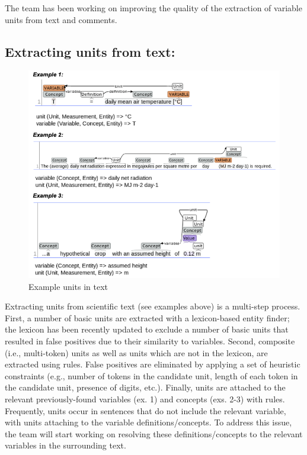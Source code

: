 \documentclass[article, 12pt, oneside]{memoir}
\begin{document}
The team has been working on improving the quality of the extraction of
variable units from text and comments.

\hypertarget{extracting-units-from-text}{%
\subsection{Extracting units from
text:}\label{extracting-units-from-text}}

\begin{figure}
\centering
\includegraphics{figs/units_text.png}
\caption{Example units in text}
\end{figure}

Extracting units from scientific text (see examples above) is a
multi-step process. First, a number of basic units are extracted with a
lexicon-based entity finder; the lexicon has been recently updated to
exclude a number of basic units that resulted in false positives due to
their similarity to variables. Second, composite (i.e., multi-token)
units as well as units which are not in the lexicon, are extracted using
rules. False positives are eliminated by applying a set of heuristic
constraints (e.g., number of tokens in the candidate unit, length of
each token in the candidate unit, presence of digits, etc.). Finally,
units are attached to the relevant previously-found variables (ex. 1)
and concepts (exs. 2-3) with rules. Frequently, units occur in sentences
that do not include the relevant variable, with units attaching to the
variable definitions/concepts. To address this issue, the team will
start working on resolving these definitions/concepts to the relevant
variables in the surrounding text.
\end{document}
